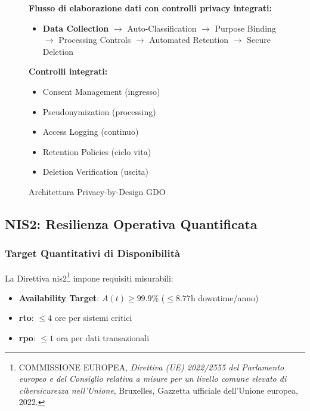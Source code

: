 \begin{figure}[htbp]
\centering
\caption{Architettura Privacy-by-Design GDO}
\label{fig:architettura-privacy-by-design}
\begin{minipage}{0.9\textwidth}
\footnotesize
\textbf{Flusso di elaborazione dati con controlli privacy integrati:}
\begin{itemize}
    \item \textbf{Data Collection} $\rightarrow$ Auto-Classification $\rightarrow$ Purpose Binding $\rightarrow$ Processing Controls $\rightarrow$ Automated Retention $\rightarrow$ Secure Deletion
\end{itemize}

\textbf{Controlli integrati:}
\begin{itemize}
    \item Consent Management (ingresso)
    \item Pseudonymization (processing)
    \item Access Logging (continuo)
    \item Retention Policies (ciclo vita)
    \item Deletion Verification (uscita)
\end{itemize}
\end{minipage}
\end{figure}

\subsection{NIS2: Resilienza Operativa Quantificata}
\label{subsec:nis2-resilienza}

\subsubsection{Target Quantitativi di Disponibilità}

La Direttiva \gls{nis2}\footnote{COMMISSIONE EUROPEA, \textit{Direttiva (UE) 2022/2555 del Parlamento europeo e del Consiglio relativa a misure per un livello comune elevato di cibersicurezza nell'Unione}, Bruxelles, Gazzetta ufficiale dell'Unione europea, 2022.} impone requisiti misurabili:

\begin{itemize}
    \item \textbf{Availability Target}: $A(t) \geq 99.9\%$ ($\leq 8.77$h downtime/anno)
    \item \textbf{\gls{rto}}: $\leq 4$ ore per sistemi critici
    \item \textbf{\gls{rpo}}: $\leq 1$ ora per dati transazionali
\end{itemize}

